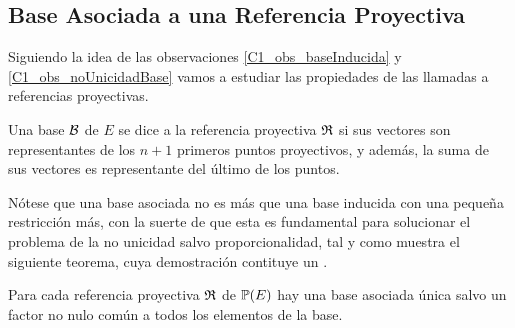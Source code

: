 \subsection{Base Asociada a una Referencia Proyectiva}
Siguiendo la idea de las observaciones \ref{C1_obs_baseInducida} y \ref{C1_obs_noUnicidadBase} vamos a estudiar las propiedades de las llamadas  a referencias proyectivas.
\begin{defi}
	\label{C1_def_baseAsociada}
	Una base $\mathcal{B}$ de $E$ se dice  a la referencia proyectiva $\mathfrak{R}$ si sus vectores son representantes de los $n+1$ primeros puntos proyectivos, y además, la suma de sus vectores es representante del último de los puntos.
\end{defi}
Nótese que una base asociada no es más que una base inducida con una pequeña restricción más, con la suerte de que esta es fundamental para solucionar el problema de la no unicidad salvo proporcionalidad, tal y como muestra el siguiente teorema, cuya demostración contituye un .
\begin{theo}
	\label{C1_teo_unicidadBase}
	Para cada referencia proyectiva $\mathfrak{R}$ de $\mathbb{P}(E)$ hay una base asociada única salvo un factor no nulo común a todos los elementos de la base.
\end{theo}
